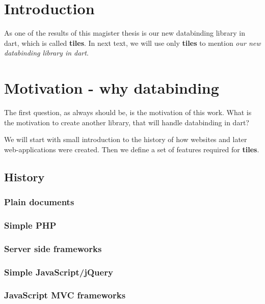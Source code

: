 \documentclass[oneside, 12pt]{book}
\begin{document}
\chapter*{Introduction}\label{chap:intro}

As one of the results of this magister thesis is our new databinding library in dart, 
which is called \textbf{tiles}. 
In next  text, we will use only \textbf{tiles} to mention \textit{our new databinding library in dart}.


\pagestyle{headings}
\chapter{Motivation - why databinding}\label{chap:motivatio}

The first question, as always should be, is the motivation of this work. 
What is the motivation to create another library, that will handle databinding in dart?

We will start with small introduction to the history of how websites and later web-applications were created. 
Then we define a set of features required for \textbf{tiles}.

\section{History}\label{sec:history}
\subsection{Plain documents}\label{subsec:history-plain-doc}
\subsection{Simple PHP}\label{subsec:history-server-side-scripts}
\subsection{Server side frameworks}\label{subsec:history-server-side-frameworks}
\subsection{Simple JavaScript/jQuery}\label{subsec:history-jquery}
\subsection{JavaScript MVC frameworks}\label{subsec:history-js-mvc}
\end{document}
